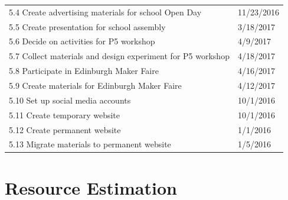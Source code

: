 \documentclass[]{report}
\begin{document}
\begin{center}
\begin{longtable}{ll}
		5.4 Create advertising materials for school Open Day                        & 11/23/2016 \\
		5.5 Create presentation for school assembly                                 & 3/18/2017  \\
		5.6 Decide on activities for P5 workshop                                    & 4/9/2017   \\
		5.7 Collect materials and design experiment for P5 workshop                 & 4/18/2017  \\
		5.8 Participate in Edinburgh Maker Faire                                    & 4/16/2017  \\
		5.9 Create materials for Edinburgh Maker Faire                              & 4/12/2017  \\
		5.10 Set up social media accounts                                           & 10/1/2016  \\
		5.11 Create temporary website                                               & 10/1/2016  \\
		5.12 Create permanent website                                               & 1/1/2016   \\
		5.13 Migrate materials to permanent website                                 & 1/5/2016  
	\end{longtable}
\end{center}

\section{Resource Estimation}
\end{document}
